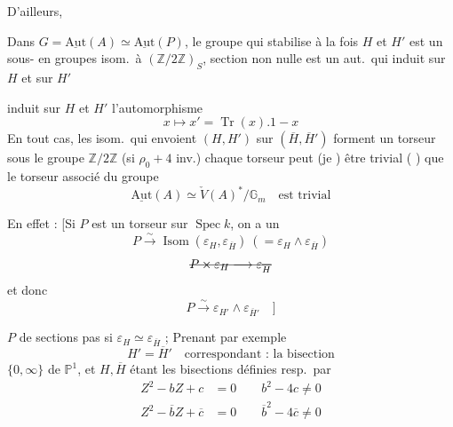 \documentclass[11pt,a4paper]{article}
\begin{document}
D'ailleurs, 

Dans $G=\underline{\mathrm{Aut}}(A)\simeq\underline{\mathrm{Aut}}(P)$, le  groupe qui stabilise à la fois $H$ et $H'$ est un sous-  en groupes isom.\ à $(\mathbb{Z}/2\mathbb{Z})_{S}$, \struck{\ill{}}  \ill{} section non nulle est un aut.\ qui induit sur $H$ et sur $H'$ \struck{\ill{}}


induit sur $H$ et $H'$ l'automorphisme
\[
x\longmapsto x'=\operatorname{Tr}(x).1-x
\]
En tout cas, les isom.\ qui envoient $(H,H')$ sur $(\overline{H},\overline{H}')$ forment un torseur sous le groupe $\mathbb{Z}/2\mathbb{Z}$ (si $\rho_{0}+4$ inv.) chaque torseur peut (je ) être  trivial (\ill{} ) que le torseur associé du groupe
\[
\underline{\mathrm{Aut}}(A)\simeq \check{V}(A)^{*}/\mathbb{G}_{m} \quad\text{est trivial}
\]

 En effet : [Si $P$ est un torseur sur $\operatorname{Spec}k$, on a un 
\[
P\xrightarrow{\ \sim\ }\operatorname{Isom}(\varepsilon_{H},\varepsilon_{\overline{H}})\ (=\varepsilon_{H}\wedge\varepsilon_{\overline{H}})
\]
\[
\text{\struck{$P\times\varepsilon_{H}\longrightarrow\varepsilon_{\overline{H}}$}}
\]
 et donc
\[
P\xrightarrow{\ \sim\ }\varepsilon_{H'}\wedge\varepsilon_{\overline{H}'} \quad ]
\]

 $P$  de sections  pas si $\varepsilon_{H}\simeq\varepsilon_{\overline{H}}$ ; Prenant par exemple
\[
H'=\overline{H}' \quad\text{correspondant : la bisection}
\]
$\{0,\infty\}$ de $\mathbb{P}^{1}$, et $H,\overline{H}$ étant les bisections définies resp.\ par
\[
\begin{aligned}
Z^{2}-bZ+c&=0 \qquad b^{2}-4c\neq 0\\
Z^{2}-\overline{b}Z+\overline{c}&=0 \qquad \overline{b}^{2}-4\overline{c}\neq 0
\end{aligned}
\]
\end{document}
